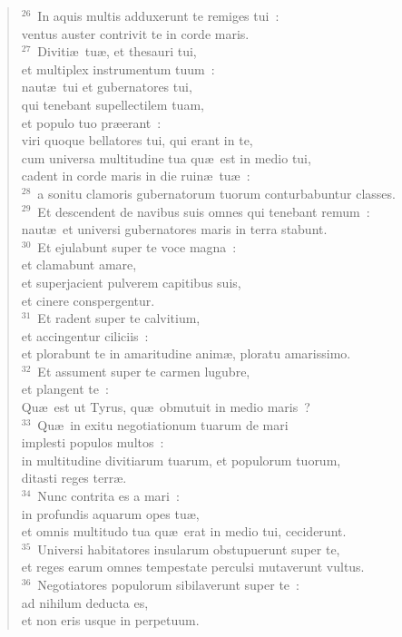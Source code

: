 \begin{flushleft}\begin{verse}${}^{26}$~In aquis multis adduxerunt te remiges tui~:\\ ventus auster contrivit te in corde maris.\\
${}^{27}$~Diviti\ae\ tu\ae , et thesauri tui,\\ et multiplex instrumentum tuum~:\\ naut\ae\ tui et gubernatores tui,\\ qui tenebant supellectilem tuam,\\ et populo tuo pr\ae erant~:\\ viri quoque bellatores tui, qui erant in te,\\ cum universa multitudine tua qu\ae\ est in medio tui,\\ cadent in corde maris in die ruin\ae\ tu\ae~:\\
${}^{28}$~a sonitu clamoris gubernatorum tuorum conturbabuntur classes.\\
${}^{29}$~Et descendent de navibus suis omnes qui tenebant remum~:\\ naut\ae\ et universi gubernatores maris in terra stabunt.\\
${}^{30}$~Et ejulabunt super te voce magna~:\\ et clamabunt amare,\\ et superjacient pulverem capitibus suis,\\ et cinere conspergentur.\\
${}^{31}$~Et radent super te calvitium,\\ et accingentur ciliciis~:\\ et plorabunt te in amaritudine anim\ae , ploratu amarissimo.\\
${}^{32}$~Et assument super te carmen lugubre,\\ et plangent te~:\\ Qu\ae\ est ut Tyrus, qu\ae\ obmutuit in medio maris~?\\
${}^{33}$~Qu\ae\ in exitu negotiationum tuarum de mari\\ implesti populos multos~:\\ in multitudine divitiarum tuarum, et populorum tuorum,\\ ditasti reges terr\ae .\\
${}^{34}$~Nunc contrita es a mari~:\\ in profundis aquarum opes tu\ae ,\\ et omnis multitudo tua qu\ae\ erat in medio tui, ceciderunt.\\
${}^{35}$~Universi habitatores insularum obstupuerunt super te,\\ et reges earum omnes tempestate perculsi mutaverunt vultus.\\
${}^{36}$~Negotiatores populorum sibilaverunt super te~:\\ ad nihilum deducta es,\\ et non eris usque in perpetuum.\end{verse}\end{flushleft}




